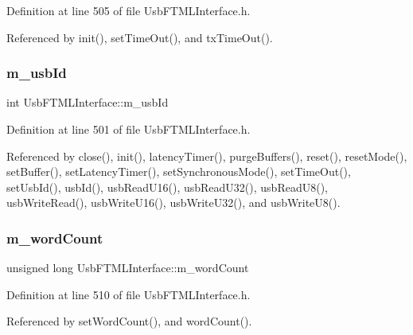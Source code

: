 Definition at line 505 of file Usb\+F\+T\+M\+L\+Interface.\+h.



Referenced by init(), set\+Time\+Out(), and tx\+Time\+Out().

\mbox{\label{classUsbFTMLInterface_aab6754587c303660d5c498ce34a2b4c8}} 
\subsubsection{\texorpdfstring{m\+\_\+usb\+Id}{m\_usbId}}
{\footnotesize\ttfamily int Usb\+F\+T\+M\+L\+Interface\+::m\+\_\+usb\+Id\hspace{0.3cm}{\ttfamily [private]}}



Definition at line 501 of file Usb\+F\+T\+M\+L\+Interface.\+h.



Referenced by close(), init(), latency\+Timer(), purge\+Buffers(), reset(), reset\+Mode(), set\+Buffer(), set\+Latency\+Timer(), set\+Synchronous\+Mode(), set\+Time\+Out(), set\+Usb\+Id(), usb\+Id(), usb\+Read\+U16(), usb\+Read\+U32(), usb\+Read\+U8(), usb\+Write\+Read(), usb\+Write\+U16(), usb\+Write\+U32(), and usb\+Write\+U8().

\mbox{\label{classUsbFTMLInterface_ab7f4399ef367c08ffe1f7034f133986e}} 
\subsubsection{\texorpdfstring{m\+\_\+word\+Count}{m\_wordCount}}
{\footnotesize\ttfamily unsigned long Usb\+F\+T\+M\+L\+Interface\+::m\+\_\+word\+Count\hspace{0.3cm}{\ttfamily [private]}}



Definition at line 510 of file Usb\+F\+T\+M\+L\+Interface.\+h.



Referenced by set\+Word\+Count(), and word\+Count().

